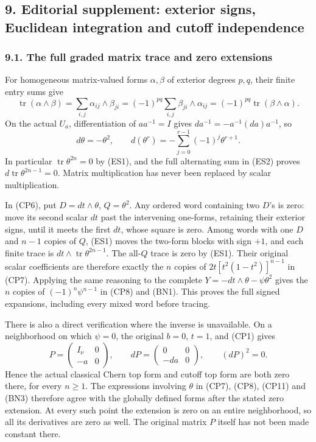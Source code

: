 \documentclass[
  11pt,
]{article}
\begin{document}
\subsection{9. Editorial supplement: exterior signs, Euclidean
integration and cutoff
independence}\label{editorial-supplement-exterior-signs-euclidean-integration-and-cutoff-independence}

\subsubsection{9.1. The full graded matrix trace and zero
extensions}\label{the-full-graded-matrix-trace-and-zero-extensions}

For homogeneous matrix-valued forms \(\alpha,\beta\) of exterior degrees
\(p,q\), their finite entry sums give \[
 \operatorname{tr}(\alpha\wedge\beta)
 =\sum_{i,j}\alpha_{ij}\wedge\beta_{ji}
 =(-1)^{pq}\sum_{i,j}\beta_{ji}\wedge\alpha_{ij}
 =(-1)^{pq}\operatorname{tr}(\beta\wedge\alpha).
 \tag{ES1}
\] On the actual \(U_a\), differentiation of \(aa^{-1}=I\) gives
\(d a^{-1}=-a^{-1}(da)a^{-1}\), so \[
 d\theta=-\theta^2,\qquad
 d(\theta^r)=-\sum_{j=0}^{r-1}(-1)^j\theta^{r+1}.
 \tag{ES2}
\] In particular \(\operatorname{tr}\theta^{2n}=0\) by (ES1), and the
full alternating sum in (ES2) proves
\(d\operatorname{tr}\theta^{2n-1}=0\). Matrix multiplication has never
been replaced by scalar multiplication.

In (CP6), put \(D=dt\wedge\theta\), \(Q=\theta^2\). Any ordered word
containing two \(D\)'s is zero: move its second scalar \(dt\) past the
intervening one-forms, retaining their exterior signs, until it meets
the first \(dt\), whose square is zero. Among words with one \(D\) and
\(n-1\) copies of \(Q\), (ES1) moves the two-form blocks with sign
\(+1\), and each finite trace is
\(dt\wedge\operatorname{tr}\theta^{2n-1}\). The all-\(Q\) trace is zero
by (ES1). Their original scalar coefficients are therefore exactly the
\(n\) copies of \(2t[t^2(1-t^2)]^{n-1}\) in (CP7). Applying the same
reasoning to the complete \(Y=-dt\wedge\theta-\psi\theta^2\) gives the
\(n\) copies of \((-1)^n\psi^{n-1}\) in (CP8) and (BN1). This proves the
full signed expansions, including every mixed word before tracing.

There is also a direct verification where the inverse is unavailable. On
a neighborhood on which \(\psi=0\), the original \(b=0\), \(t=1\), and
(CP1) gives \[
 P=\begin{pmatrix}I_\nu&0\\-a&0\end{pmatrix},\qquad
 dP=\begin{pmatrix}0&0\\-da&0\end{pmatrix},\qquad
 (dP)^2=0.
 \tag{ES3}
\] Hence the actual classical Chern top form and cutoff top form are
both zero there, for every \(n\ge1\). The expressions involving
\(\theta\) in (CP7), (CP8), (CP11) and (BN3) therefore agree with the
globally defined forms after the stated zero extension. At every such
point the extension is zero on an entire neighborhood, so all its
derivatives are zero as well. The original matrix \(P\) itself has not
been made constant there.
\end{document}
